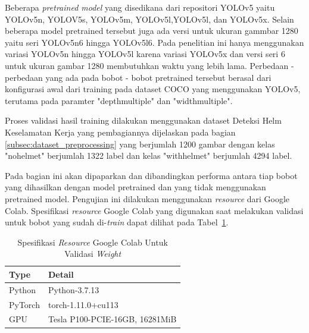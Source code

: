 \par Beberapa \emph{pretrained model} yang disedikana dari repositori YOLOv5 yaitu YOLOv5n, YOLOV5s, YOLOv5m, YOLOv5l,YOLOv5l, dan YOLOv5x. Selain beberapa model pretrained tersebut juga ada versi untuk ukuran gammbar 1280 yaitu seri YOLOv5n6 hingga YOLOv5l6. Pada penelitian ini hanya menggunakan variasi YOLOv5n hingga YOLOv5l karena variasi YOLOv5x dan versi seri 6 untuk ukuran gambar 1280 membutuhkan waktu yang lebih lama. Perbedaan - perbedaan yang ada pada bobot - bobot pretrained tersebut berasal dari konfigurasi awal dari training pada dataset COCO yang menggunakan YOLOv5, terutama pada paramter "depth\textunderscore multiple" dan "width\textunderscore multiple".


\par Proses validasi hasil training dilakukan menggunakan dataset Deteksi Helm Keselamatan Kerja yang pembagiannya dijelaskan pada bagian \ref{subsec:dataset_preprocessing} yang berjumlah 1200 gambar dengan kelas "no\textunderscore helmet" berjumlah 1322 label dan kelas "with\textunderscore helmet" berjumlah 4294 label.


\par Pada bagian ini akan dipaparkan dan dibandingkan performa antara tiap bobot yang dihasilkan dengan model pretrained dan yang tidak menggunakan pretrained model. Pengujian ini dilakukan menggunakan \emph{resource} dari Google Colab. Spesifikasi \emph{resource} Google Colab yang digunakan saat melakukan validasi untuk bobot yang sudah di-\emph{train} dapat dilihat pada Tabel~\ref{tb:spekgoogleclab}.

\begin{table}
  \centering
  \caption{Spesifikasi \emph{Resource} Google Colab Untuk Validasi \emph{Weight}}
  \label{tb:spekgoogleclab}
  \begin{tabular}{|l|l|} 
  \hline
  Type    & Detail                      \\ 
  \hline
  Python  & Python-3.7.13                   \\
  PyTorch & torch-1.11.0+cu113              \\
  GPU     & Tesla P100-PCIE-16GB, 16281MiB  \\
  \hline
  \end{tabular}
\end{table}


